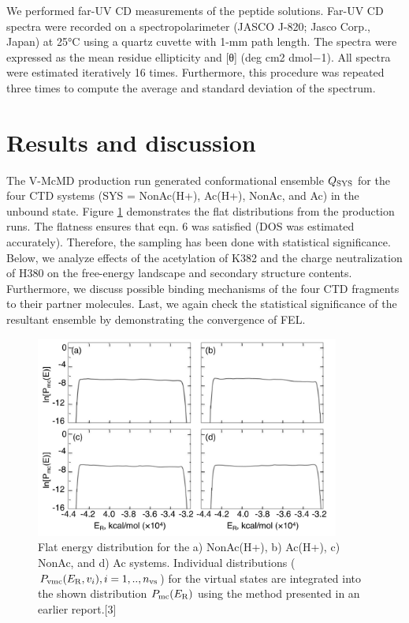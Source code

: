 We performed far-UV CD measurements of the peptide solutions. Far-UV CD spectra were recorded on a spectropolarimeter (JASCO J-820; Jasco Corp., Japan) at 25°C using a quartz cuvette with 1-mm path length. The spectra were expressed as the mean residue ellipticity and [θ] (deg cm2 dmol−1). All spectra were estimated iteratively 16 times. Furthermore, this procedure was repeated three times to compute the average and standard deviation of the spectrum.

\section{Results and discussion}
The V-McMD production run generated conformational ensemble $Q_{\rm SYS}$ for the four CTD systems (SYS = NonAc(H+), Ac(H+), NonAc, and Ac) in the unbound state. Figure \ref{fig:P_vmc_p53} demonstrates the flat distributions from the production runs. The flatness ensures that eqn. 6 was satisfied (DOS was estimated accurately). Therefore, the sampling has been done with statistical significance. Below, we analyze effects of the acetylation of K382 and the charge neutralization of H380 on the free-energy landscape and secondary structure contents. Furthermore, we discuss possible binding mechanisms of the four CTD fragments to their partner molecules. Last, we again check the statistical significance of the resultant ensemble by demonstrating the convergence of FEL.
\begin{figure}
  \centering
  \includegraphics[width=10cm]{../single_CTD/figures_p53ctd/2.pdf}
  \caption{\label{fig:P_vmc_p53} Flat energy distribution for the a) NonAc(H+), b) Ac(H+), c) NonAc, and d) Ac systems. 
Individual distributions ($P_{\rm vmc}(E_{\rm R},v_i), i=1,..,n_{\rm vs}$) for the virtual states are integrated into the shown distribution $P_{\rm mc}(E_{\rm R})$ using the method presented in an earlier report.[3]}
\end{figure}

